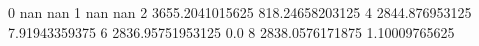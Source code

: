 0 nan nan
1 nan nan
2 3655.2041015625 818.24658203125
4 2844.876953125 7.91943359375
6 2836.95751953125 0.0
8 2838.0576171875 1.10009765625
